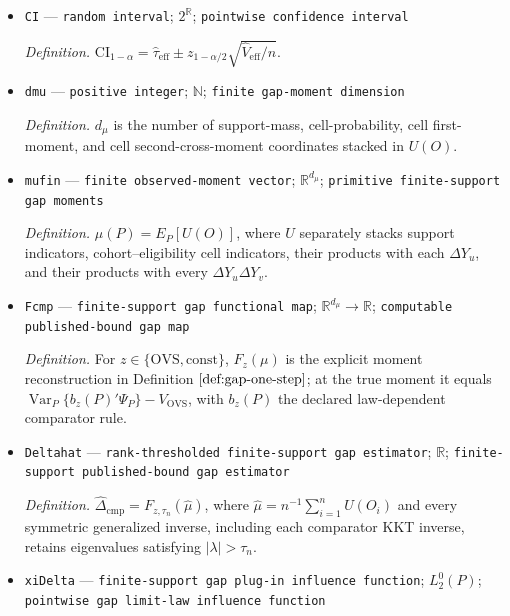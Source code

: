 \documentclass{article}
\begin{document}
\begin{itemize}
  \item \texttt{CI} --- \texttt{random interval}; \(2^{\mathbb R}\); \texttt{pointwise confidence interval}
  \par\smallskip\noindent\emph{Definition.} \(\mathrm{CI}_{1-\alpha}=\widehat\tau_{\mathrm{eff}}\pm z_{1-\alpha/2}\sqrt{\widehat V_{\mathrm{eff}}/n}\).
  \item \texttt{dmu} --- \texttt{positive integer}; \(\mathbb N\); \texttt{finite gap-\allowbreak{}moment dimension}
  \par\smallskip\noindent\emph{Definition.} \(d_\mu\) is the number of support-mass, cell-probability, cell first-moment, and cell second-cross-moment coordinates stacked in \(U(O)\).
  \item \texttt{mufin} --- \texttt{finite observed-\allowbreak{}moment vector}; \(\mathbb R^{d_\mu}\); \texttt{primitive finite-\allowbreak{}support gap moments}
  \par\smallskip\noindent\emph{Definition.} \(\mu(P)=E_P[U(O)]\), where \(U\) separately stacks support indicators, cohort--eligibility cell indicators, their products with each \(\Delta Y_u\), and their products with every \(\Delta Y_u\Delta Y_v\).
  \item \texttt{Fcmp} --- \texttt{finite-\allowbreak{}support gap functional map}; \(\mathbb R^{d_\mu}\to\mathbb R\); \texttt{computable published-\allowbreak{}bound gap map}
  \par\smallskip\noindent\emph{Definition.} For \(z\in\{\mathrm{OVS},\mathrm{const}\}\), \(F_z(\mu)\) is the explicit moment reconstruction in Definition \(\ref{def:gap-one-step}\); at the true moment it equals \(\operatorname{Var}_P\{b_z(P)'\Psi_P\}-V_{\mathrm{OVS}}\), with \(b_z(P)\) the declared law-dependent comparator rule.
  \item \texttt{Deltahat} --- \texttt{rank-\allowbreak{}thresholded finite-\allowbreak{}support gap estimator}; \(\mathbb R\); \texttt{finite-\allowbreak{}support published-\allowbreak{}bound gap estimator}
  \par\smallskip\noindent\emph{Definition.} \(\widehat\Delta_{\mathrm{cmp}}=F_{z,\tau_n}(\widehat\mu)\), where \(\widehat\mu=n^{-1}\sum_{i=1}^nU(O_i)\) and every symmetric generalized inverse, including each comparator KKT inverse, retains eigenvalues satisfying \(|\lambda|>\tau_n\).
  \item \texttt{xiDelta} --- \texttt{finite-\allowbreak{}support gap plug-\allowbreak{}in influence function}; \(L_2^0(P)\); \texttt{pointwise gap limit-\allowbreak{}law influence function}

\end{itemize}
\end{document}
